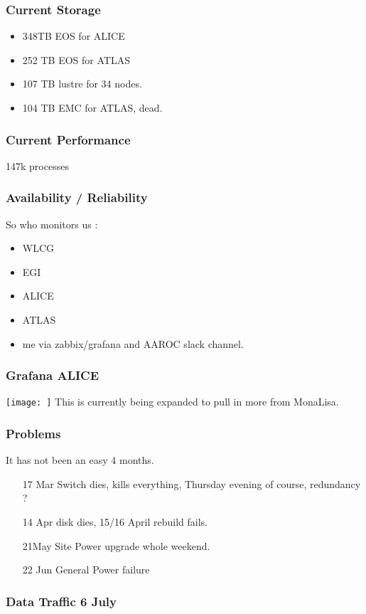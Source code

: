 \documentclass{beamer}
\begin{document}
\begin{frame}
  \frametitle{Current Storage}
  \begin{itemize}
    \item 348TB EOS for ALICE
    \item 252 TB EOS for ATLAS
    \item 107 TB lustre for 34 nodes.
    \item 104 TB EMC for ATLAS, dead.
  \end{itemize}
\end{frame}

\begin{frame}
  \frametitle{Current Performance}
147k processes
\end{frame}

\begin{frame}
  \frametitle{Availability / Reliability}
  So who monitors us :
  \begin{itemize}
    \item WLCG
    \item EGI
    \item ALICE
    \item ATLAS
    \item me via zabbix/grafana and AAROC slack channel.
  \end{itemize}
\end{frame}

\begin{frame}
  \frametitle{Grafana ALICE}
  \texttt{[image: ]}
  This is currently being expanded to pull in more from MonaLisa.
\end{frame}

\begin{frame}
\frametitle{Problems}
It has not been an easy 4 months.
\begin{itemize}
  \item [17 Mar] Switch dies, kills everything, Thursday evening of course, redundancy ?
  \item [14 Apr] disk dies, 15/16 April rebuild fails.
  \item [21May] Site Power upgrade whole weekend.
  \item [22 Jun] General Power failure
\end{itemize}
\end{frame}

\begin{frame}
  \frametitle{Data Traffic 6 July}
\end{frame}
\end{document}
